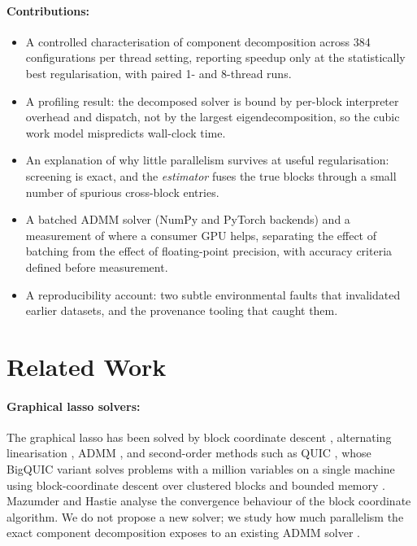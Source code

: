 \documentclass[pdflatex,sn-mathphys-num]{sn-jnl}
\begin{document}
\paragraph{Contributions:}
\begin{itemize}
\item A controlled characterisation of component decomposition across
 384 configurations per thread setting, reporting speedup only at the
 statistically best regularisation, with paired 1- and 8-thread runs.
\item A profiling result: the decomposed solver is bound by per-block
 interpreter overhead and dispatch, not by the largest eigendecomposition,
 so the cubic work model mispredicts wall-clock time.
\item An explanation of why little parallelism survives at useful
 regularisation: screening is exact, and the \emph{estimator} fuses the true
 blocks through a small number of spurious cross-block entries.
\item A batched ADMM solver (NumPy and PyTorch backends) and a measurement of
 where a consumer GPU helps, separating the effect of batching from the
 effect of floating-point precision, with accuracy criteria defined before measurement.
\item A reproducibility account: two subtle environmental faults that
 invalidated earlier datasets, and the provenance tooling that caught them.
\end{itemize}
\section{Related Work}
\paragraph{Graphical lasso solvers:} The graphical lasso \cite{friedman2008,
banerjee2008} has been solved by block coordinate descent \cite{friedman2008},
alternating linearisation \cite{scheinberg2010}, ADMM \cite{boyd2011}, and
second-order methods such as QUIC \cite{hsieh2014quic}, whose BigQUIC variant
solves problems with a million variables on a single machine using
block-coordinate descent over clustered blocks and bounded memory
\cite{hsieh2013bigquic}. Mazumder and Hastie \cite{mazumder2012ejs}
analyse the convergence behaviour of the block coordinate algorithm. We do not
propose a new solver; we study how much parallelism the exact component
decomposition exposes to an existing ADMM solver \cite{gglasso2021}.
\end{document}
